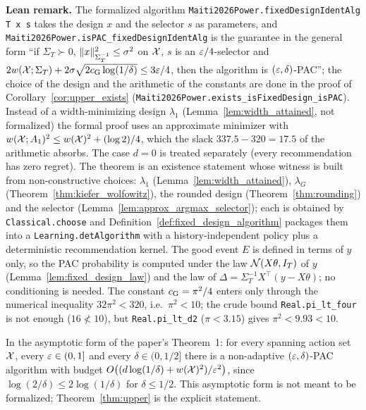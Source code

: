 \textbf{Lean remark.} The formalized algorithm \texttt{Maiti2026Power.fixedDesignIdentAlg T x s}
takes the design $x$ and the selector $s$ as parameters, and
\texttt{Maiti2026Power.isPAC\_fixedDesignIdentAlg} is the guarantee in the general form ``if
$\Sigma_T \succ 0$, $\lVert x \rVert^2_{\Sigma_T^{-1}} \le \sigma^2$ on $\mathcal{X}$, $s$ is an $\varepsilon/4$-selector
and $2w(\mathcal{X};\Sigma_T) + 2\sigma\sqrt{2c_{\mathrm{G}}\log(1/\delta)} \le 3\varepsilon/4$, then the
algorithm is $(\varepsilon,\delta)$-PAC''; the choice of the design and the arithmetic of the
constants are done in the proof of Corollary~\ref{cor:upper_exists}
(\texttt{Maiti2026Power.exists\_isFixedDesign\_isPAC}). Instead of a width-minimizing design
$\lambda_1$ (Lemma~\ref{lem:width_attained}, not formalized) the formal proof uses an
approximate minimizer with $w(\mathcal{X};A_1)^2 \le w(\mathcal{X})^2 + (\log 2)/4$, which the slack
$337.5 - 320 = 17.5$ of the arithmetic absorbs. The case $d = 0$ is treated separately (every
recommendation has zero regret). The theorem is an existence statement whose witness is built from
non-constructive choices: $\lambda_1$ (Lemma~\ref{lem:width_attained}), $\lambda_G$
(Theorem~\ref{thm:kiefer_wolfowitz}), the rounded design (Theorem~\ref{thm:rounding}) and the
selector (Lemma~\ref{lem:approx_argmax_selector}); each is obtained by \texttt{Classical.choose}
and Definition~\ref{def:fixed_design_algorithm} packages them into a
\texttt{Learning.detAlgorithm} with a history-independent policy plus a deterministic
recommendation kernel. The good event $E$ is defined in terms of $y$ only, so the PAC
probability is computed under the law $\mathcal{N}(X\theta,I_T)$ of $y$
(Lemma~\ref{lem:fixed_design_law}) and the law of $\Delta = \Sigma_T^{-1}X^\top(y - X\theta)$; no
conditioning is needed. The constant $c_{\mathrm{G}} = \pi^2/4$ enters only through the numerical
inequality $32\pi^2 < 320$, i.e.\ $\pi^2 < 10$; the crude bound \texttt{Real.pi\_lt\_four}
is not enough ($16 \not< 10$), but \texttt{Real.pi\_lt\_d2} ($\pi < 3.15$) gives
$\pi^2 < 9.93 < 10$.

\begin{remark}\label{rem:upper_asymptotic}
In the asymptotic form of the paper's Theorem~1: for every spanning action set $\mathcal{X}$, every
$\varepsilon \in (0,1]$ and every $\delta \in (0,1/2]$ there is a non-adaptive $(\varepsilon,\delta)$-PAC
algorithm with budget $O\big((d\log(1/\delta) + w(\mathcal{X})^2)/\varepsilon^2\big)$, since
$\log(2/\delta) \le 2\log(1/\delta)$ for $\delta \le 1/2$. This asymptotic form is not meant to
be formalized; Theorem~\ref{thm:upper} is the explicit statement.
\end{remark}

